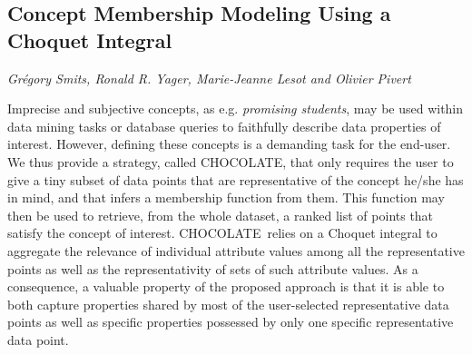 \documentclass[../booklet.tex]{subfiles}
\begin{document}
\subsection[Concept Membership Modeling Using a Choquet Integral. {\it Grégory Smits, Ronald R. Yager, Marie-Jeanne Lesot and Olivier Pivert}]{Concept Membership Modeling Using a Choquet Integral}
   

\begin{center}
  {\it Grégory Smits, Ronald R. Yager, Marie-Jeanne Lesot and Olivier Pivert}
\end{center}

\vskip 0.8cm

\newcommand{\nom}{CHOCOLATE}

  Imprecise and subjective concepts, as e.g. {\it promising students}, 
  may be used within data mining tasks or database queries to faithfully describe
  data properties of interest.
  However, defining these concepts is a demanding task for
  the end-user. We thus provide a strategy, called \nom, that
  only requires the user to give a tiny subset of data points that
  are representative of the concept he/she has in mind, and that
  infers a membership function from them. This function may then be
  used to retrieve, from the whole dataset, a ranked list of points that satisfy the concept of interest. \nom\ relies on a
  Choquet integral to aggregate the relevance of individual attribute
  values among all the representative points as well as the
  representativity of sets of such attribute values.  As a
  consequence, a valuable property of the proposed approach is that it
  is able to both capture properties shared by most of the
  user-selected representative data points as well as specific
  properties possessed by only one specific representative data point.
\end{document}
